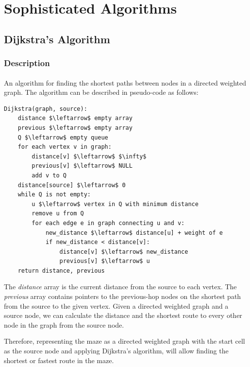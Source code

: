 \documentclass[12pt]{article}
\begin{document}
\section{Sophisticated Algorithms} \label{sophisticated-algorithms}
\subsection{Dijkstra's Algorithm} \label{Dijkstra's Algorithm}
\subsubsection{Description}
\paragraph{}
An algorithm for finding the shortest paths between nodes in a directed weighted \gls{graph}.
The algorithm can be described in pseudo-code as follows:

\begin{lstlisting}[mathescape, caption={Dijkstra's algorithm pseudo-code}, captionpos=b]
Dijkstra(graph, source):
    distance $\leftarrow$ empty array
    previous $\leftarrow$ empty array
    Q $\leftarrow$ empty queue
    for each vertex v in graph:
        distance[v] $\leftarrow$ $\infty$
        previous[v] $\leftarrow$ NULL
        add v to Q
    distance[source] $\leftarrow$ 0
    while Q is not empty:
        u $\leftarrow$ vertex in Q with minimum distance
        remove u from Q
        for each edge e in graph connecting u and v:
            new_distance $\leftarrow$ distance[u] + weight of e
            if new_distance < distance[v]:
                distance[v] $\leftarrow$ new_distance
                previous[v] $\leftarrow$ u
    return distance, previous
\end{lstlisting}

The \textit{distance} array is the current distance from the source to each vertex.
The \textit{previous} array contains pointers to the previous-hop nodes on the shortest path from the source to the given vertex.
Given a directed weighted \gls{graph} and a source node, we can calculate the distance and the shortest route to every other node in the \gls{graph} from the source node.

Therefore, representing the \gls{maze} as a directed weighted \gls{graph} with the start \gls{cell} as the source node and applying Dijkstra's algorithm, will allow finding the shortest or fastest route in the \gls{maze}.
\end{document}
